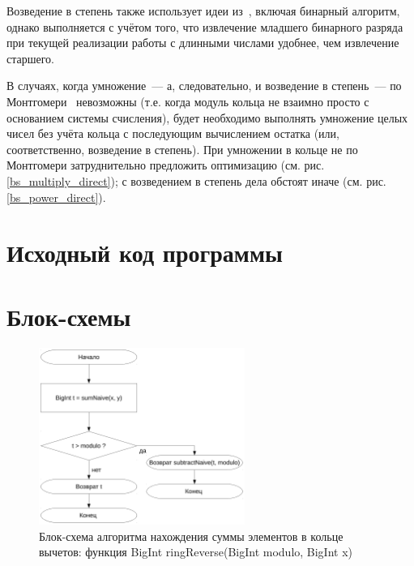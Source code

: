 \documentclass[a4paper,12pt]{article} %
\begin{document}
Возведение в степень также использует идеи из~\cite{Glukhov},
включая бинарный алгоритм, однако выполняется с учётом того,
что извлечение младшего бинарного разряда при текущей реализации
работы с длинными числами удобнее, чем извлечение старшего.

В случаях, когда умножение~--- а, следовательно, и возведение в степень~--- по Монтгомери~\cite{Glukhov}
невозможны (т.е. когда модуль кольца не взаимно просто с основанием системы счисления),
будет необходимо выполнять умножение целых чисел без учёта кольца с последующим вычислением остатка
(или, соответственно, возведение в степень).
При умножении в кольце не по Монтгомери затруднительно предложить оптимизацию (см. рис. \ref{bs_multiply_direct});
с возведением в степень дела обстоят иначе (см. рис. \ref{bs_power_direct}).

\section*{Исходный код программы}










\section*{Блок-схемы}


\begin{figure}[ht]
	\centering
	\includegraphics[width=0.6\textwidth]{lr5_sumRing.pdf}
	\caption{
		Блок-схема алгоритма нахождения суммы элементов в кольце вычетов:
		функция BigInt ringReverse(BigInt modulo, BigInt x)
	}
	\label{bs_plus}
\end{figure}
\end{document}
